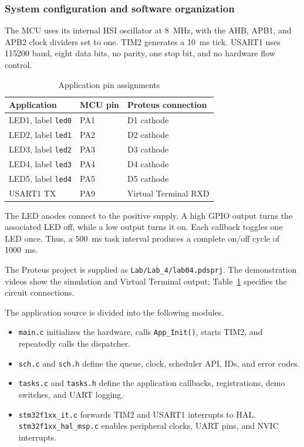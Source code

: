 \subsubsection{System configuration and software organization}
The MCU uses its internal HSI oscillator at 8~MHz, with the AHB, APB1, and APB2 clock dividers set to one. TIM2 generates a 10~ms tick. USART1 uses 115200 baud, eight data bits, no parity, one stop bit, and no hardware flow control.

\begin{table}[!htp]
    \centering
    \begin{tabular}{lll}
        \toprule
        Application & MCU pin & Proteus connection \\
        \midrule
        LED1, label \texttt{led0} & PA1 & D1 cathode \\
        LED2, label \texttt{led1} & PA2 & D2 cathode \\
        LED3, label \texttt{led2} & PA3 & D3 cathode \\
        LED4, label \texttt{led3} & PA4 & D4 cathode \\
        LED5, label \texttt{led4} & PA5 & D5 cathode \\
        USART1 TX & PA9 & Virtual Terminal RXD \\
        \bottomrule
    \end{tabular}
    \caption{Application pin assignments}
    \label{lab4_pins}
\end{table}

The LED anodes connect to the positive supply. A high GPIO output turns the associated LED off, while a low output turns it on. Each callback toggles one LED once. Thus, a 500~ms task interval produces a complete on/off cycle of 1000~ms.

The Proteus project is supplied as \texttt{Lab/Lab\_4/lab04.pdsprj}. The demonstration videos show the simulation and Virtual Terminal output; Table~\ref{lab4_pins} specifies the circuit connections.

The application source is divided into the following modules.
\begin{itemize}
    \item \texttt{main.c} initializes the hardware, calls \texttt{App\_Init()}, starts TIM2, and repeatedly calls the dispatcher.
    \item \texttt{sch.c} and \texttt{sch.h} define the queue, clock, scheduler API, IDs, and error codes.
    \item \texttt{tasks.c} and \texttt{tasks.h} define the application callbacks, registrations, demo switches, and UART logging.
    \item \texttt{stm32f1xx\_it.c} forwards TIM2 and USART1 interrupts to HAL. \texttt{stm32f1xx\_hal\_msp.c} enables peripheral clocks, UART pins, and NVIC interrupts.
\end{itemize}

